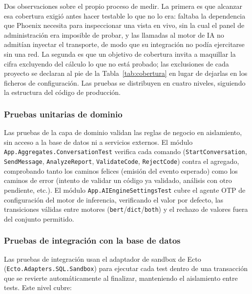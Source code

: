 Dos observaciones sobre el propio proceso de medir. La primera es que alcanzar esa cobertura exigió antes hacer testable lo que no lo era: faltaba la dependencia que Phoenix necesita para inspeccionar una vista en vivo, sin la cual el panel de administración era imposible de probar, y las llamadas al motor de IA no admitían inyectar el transporte, de modo que su integración no podía ejercitarse sin una red. La segunda es que un objetivo de cobertura invita a maquillar la cifra excluyendo del cálculo lo que no está probado; las exclusiones de cada proyecto se declaran al pie de la Tabla~\ref{tab:cobertura} en lugar de dejarlas en los ficheros de configuración. Las pruebas se distribuyen en cuatro niveles, siguiendo la estructura del código de producción.

\subsubsection*{Pruebas unitarias de dominio}

Las pruebas de la capa de dominio validan las reglas de negocio en aislamiento, sin acceso a la base de datos ni a servicios externos. El módulo \texttt{App.Aggregates.ConversationTest} verifica cada comando (\texttt{StartConversation}, \texttt{SendMessage}, \texttt{AnalyzeReport}, \texttt{ValidateCode}, \texttt{RejectCode}) contra el agregado, comprobando tanto los caminos felices (emisión del evento esperado) como los caminos de error (intento de validar un código ya validado, análisis con otro pendiente, etc.). El módulo \texttt{App.AIEngineSettingsTest} cubre el agente OTP de configuración del motor de inferencia, verificando el valor por defecto, las transiciones válidas entre motores (\texttt{bert}/\texttt{dict}/\texttt{both}) y el rechazo de valores fuera del conjunto permitido.

\subsubsection*{Pruebas de integración con la base de datos}

Las pruebas de integración usan el adaptador de sandbox de Ecto (\texttt{Ecto.Adapters.SQL.Sandbox}) para ejecutar cada test dentro de una transacción que se revierte automáticamente al finalizar, manteniendo el aislamiento entre tests. Este nivel cubre:

